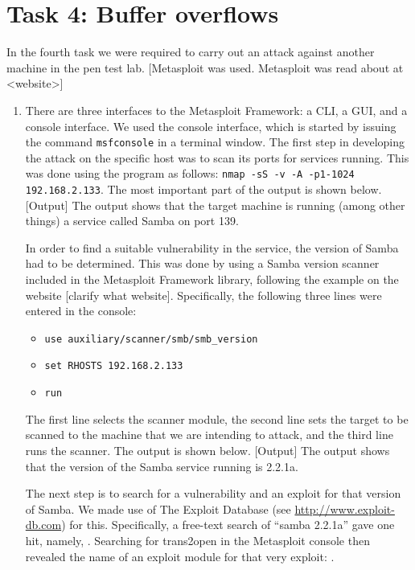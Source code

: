\section*{Task 4: Buffer overflows}
In the fourth task we were required to carry out an attack against another machine in the pen test lab. [Metasploit was used. Metasploit was read about at <website>]
\begin{enumerate}
\item %
  There are three interfaces to the Metasploit Framework: a CLI, a GUI, and a console interface\cite{}. We used the console interface, which is started by issuing the command \lstinline{msfconsole} in a terminal window.
  The first step in developing the attack on the specific host was to scan its ports for services running. This was done using the program  as follows: \lstinline{nmap -sS -v -A -p1-1024 192.168.2.133}. The most important part of the output is shown below.
[Output]
The output shows that the target machine is running (among other things) a service called Samba on port 139.

In order to find a suitable vulnerability in the service, the version of Samba had to be determined. This was done by using a Samba version scanner included in the Metasploit Framework library, following the example on the website [clarify what website]. Specifically, the following three lines were entered in the console:
\begin{itemize}
\item \lstinline{use auxiliary/scanner/smb/smb_version}
\item \lstinline{set RHOSTS 192.168.2.133}
\item \lstinline{run}
\end{itemize}
The first line selects the scanner module, the second line sets the target to be scanned to the machine that we are intending to attack, and the third line runs the scanner. The output is shown below.
[Output]
The output shows that the version of the Samba service running is 2.2.1a.

The next step is to search for a vulnerability and an exploit for that version of Samba. We made use of The Exploit Database (see \url{http://www.exploit-db.com}) for this. Specifically, a free-text search of ``samba 2.2.1a'' gave one hit, namely, . Searching for trans2open in the Metasploit console then revealed the name of an exploit module for that very exploit: .


\end{enumerate}
